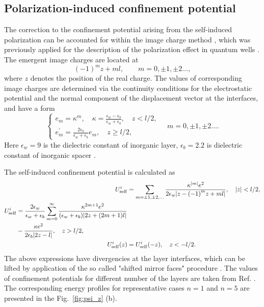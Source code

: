 \documentclass[prb,twocolumn,preprintnumbers,superscriptaddress]{revtex4}
\begin{document}
\subsection{Polarization-induced confinement potential}

The correction to the confinement potential arising from the self-induced polarization can be accounted for within the image charge method \cite{PanofskyBook}, which was previously applied for the description of the polarization effect in quantum wells \cite{Kumagai1989}. The emergent image charges are located at 
%
\begin{equation}
    (-1)^m z + m l, \qquad m =  0, \pm 1, \pm 2 \ldots ,
\end{equation}
%
where $z$ denotes the position of the real charge. 
The values of corresponding image charges are determined via the continuity conditions for the electrostatic potential and the normal component of the displacement vector at the interfaces, and have a form
%
\begin{equation}
    \begin{cases}
    e_m = \kappa^m, \quad \kappa = \frac{\epsilon_w-\epsilon_b}{\epsilon_w+\epsilon_b}, \quad z <l/2, \\
    e^\prime_m =  \frac{2\epsilon_b}{\epsilon_w+\epsilon_b}{e}_{m}, \quad  z \geq l/2,
    \end{cases}
    \quad m =  0, \pm 1, \pm 2 \ldots .
\end{equation}
%
Here $\epsilon_w = 9$ is the dielectric constant of inorganic layer, $\epsilon_b=2.2$ is dielectric constant of inorganic spacer \cite{Blancon2018}. 

The self-induced confinement potential is calculated as
%
\begin{align}
    U_{\rm self}^i &= 
    \sum_{m=\pm1,\pm2, ...}
    \frac{\kappa^{|m|} e^2 }{2 \epsilon_w  |z - {\left( { - 1} \right)^m}{z } + ml|},
    \quad |z| < l/2,
     \notag \\
    \begin{split}
    U_{\rm self}^i & = \frac{2 \epsilon_w}{\epsilon_w + \epsilon_b} \sum_{m=0}^{\infty} \frac{\kappa^{2m+1} e^2}{(\epsilon_w + \epsilon_b)
     |2z + (2m+1)l |} \\
    & - \frac{\kappa e^2}{2 \epsilon_b | 2 z - l|},
    \quad z > l/2 ,
    \end{split} 
     \notag \\
    U_{\rm self}^i(z) & = U_{\rm self}^i(-z),
    \quad z < -l/2 .
\end{align}
%
The above expressions have divergencies at the layer interfaces, which can be lifted by application of the so called "shifted mirror faces" procedure \cite{Lang1973,Kumagai1989}. 
The values of confinement potentials for different number of the layers are taken from Ref. \cite{Blancon2018}. 
The corresponding energy profiles for representative cases $n=1$ and $n=5$ are presented in the Fig.~\ref{fig:psi_z} (b).
\end{document}
